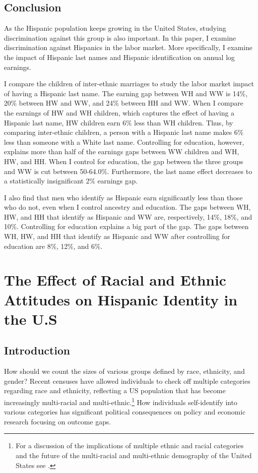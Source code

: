 \documentclass[12pt, fullpage]{article}
\begin{document}
\subsection{Conclusion}\label{sec:con1}

As the Hispanic population keeps growing in the United States, studying discrimination against this group is also important. In this paper, I examine discrimination against Hispanics in the labor market. More specifically, I examine the impact of Hispanic last names and Hispanic identification on annual log earnings. 

I compare the children of inter-ethnic marriages to study the labor market impact of having a Hispanic last name. The earning gap between WH and WW is 14\%, 20\% between HW and WW, and 24\% between HH and WW. When I compare the earnings of HW and WH children, which captures the effect of having a Hispanic last name, HW children earn  6\% less than WH children. Thus, by comparing inter-ethnic children, a person with a Hispanic last name makes 6\% less than someone with a White last name. Controlling for education, however, explains more than half of the earnings gaps between WW children and WH, HW, and HH. When I control for education, the gap between the three groups and WW is cut between 50-64.0\%. Furthermore, the last name effect decreases to a statistically insignificant 2\% earnings gap.

I also find that men who identify as Hispanic earn significantly less than those who do not, even when I control ancestry and education. The gaps between WH, HW, and HH that identify as Hispanic and WW are, respectively, 14\%, 18\%, and 10\%. Controlling for education explains a big part of the gap. The gaps between WH, HW, and HH that identify as Hispanic and WW after controlling for education are 8\%, 12\%, and 6\%. 

\pagebreak
\newpage

\section[\bf \uppercase{The Effect of Racial and Ethnic Attitudes on Hispanic Identity in the U.S}]{The Effect of Racial and Ethnic Attitudes on Hispanic Identity in the U.S}

\subsection{Introduction}\label{sec:intro}

How should we count the sizes of various groups defined by race, ethnicity, and gender? Recent censuses have allowed individuals to check off multiple categories regarding race and ethnicity, reflecting a US population that has become increasingly multi-racial and multi-ethnic.\footnote{For a discussion of the implications of multiple ethnic and racial categories and the future of the multi-racial and multi-ethnic demography of the United States see \citet{bratterMultiracialIdentificationRacial2018,albaGreatDemographicIllusion2020}.} How individuals self-identify into various categories has significant political consequences on policy and economic research focusing on outcome gaps.
\end{document}
